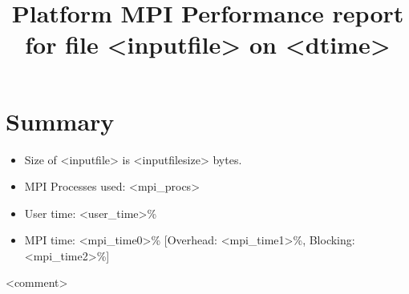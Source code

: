 \documentclass[12pt,a4paper]{article}
\title{Platform MPI Performance report for file <inputfile> on <dtime>}
\begin{document}
\maketitle
\section*{Summary}
\begin{itemize}
    \item Size of <inputfile> is <inputfilesize> bytes.
    \item MPI Processes used: <mpi_procs>
    \item User time: <user_time>\%
    \item MPI time: <mpi_time0>\% [Overhead: <mpi_time1>\%, Blocking: <mpi_time2>\%]
\end{itemize}
<comment>
\end{document}
